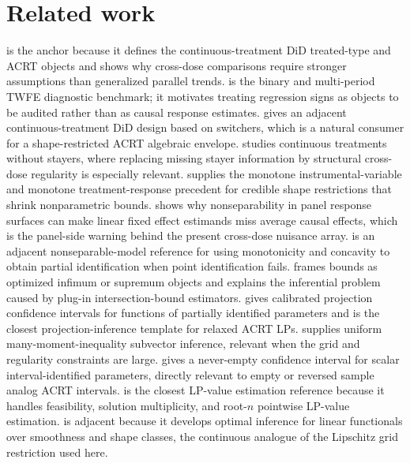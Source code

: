 \documentclass[11pt]{article}
\theoremstyle{definition}
\theoremstyle{plain}
\theoremstyle{remark}
\begin{document}
\section{Related work}
\citet{CallawayGoodmanBaconSantAnna2021} is the anchor because it defines the
continuous-treatment DiD treated-type and ACRT objects and shows why
cross-dose comparisons require stronger assumptions than generalized parallel
trends.  \citet{deChaisemartinDHaultfoeuille2020} is the binary and
multi-period TWFE diagnostic benchmark; it motivates treating regression signs
as objects to be audited rather than as causal response estimates.
\citet{deChaisemartinDHaultfoeuillePasquierSowVazquezBare2022} gives an
adjacent continuous-treatment DiD design based on switchers, which is a natural
consumer for a shape-restricted ACRT algebraic envelope.
\citet{deChaisemartinDHaultfoeuilleVazquezBare2024} studies continuous
treatments without stayers, where replacing missing stayer information by
structural cross-dose regularity is especially relevant.
\citet{ManskiPepper2000} supplies the monotone instrumental-variable and
monotone treatment-response precedent for credible shape restrictions that
shrink nonparametric bounds.  \citet{ChernozhukovFernandezValHahnNewey2013}
shows why nonseparability in panel response surfaces can make linear fixed
effect estimands miss average causal effects, which is the panel-side warning
behind the present cross-dose nuisance array.  \citet{Ishihara2017} is an
adjacent nonseparable-model reference for using monotonicity and concavity to
obtain partial identification when point identification fails.
\citet{ChernozhukovLeeRosen2013} frames bounds as optimized infimum or
supremum objects and explains the inferential problem caused by plug-in
intersection-bound estimators.  \citet{KaidoMolinariStoye2019} gives
calibrated projection confidence intervals for functions of partially
identified parameters and is the closest projection-inference template for
relaxed ACRT LPs.  \citet{BelloniBugniChernozhukov2018} supplies uniform
many-moment-inequality subvector inference, relevant when the grid and
regularity constraints are large.  \citet{Stoye2020} gives a never-empty
confidence interval for scalar interval-identified parameters, directly
relevant to empty or reversed sample analog ACRT intervals.  \citet{Voronin2025}
is the closest LP-value estimation reference because it handles feasibility,
solution multiplicity, and root-\(n\) pointwise LP-value estimation.
\citet{ArmstrongKolesar2018} is adjacent because it develops optimal inference
for linear functionals over smoothness and shape classes, the continuous
analogue of the Lipschitz grid restriction used here.
\end{document}
